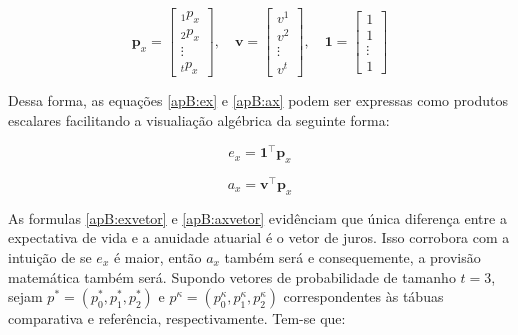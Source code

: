\begin{equation}
    \mathbf{p}_x = 
    \begin{bmatrix} 
    {}_{1}p_x \\  
    {}_{2}p_x \\ 
    \vdots \\ 
    {}_{t}p_x 
    \end{bmatrix}, \quad 
    \mathbf{v} = 
    \begin{bmatrix} 
    v^1 \\ 
    v^2 \\ 
    \vdots \\ 
    v^t 
    \end{bmatrix}, \quad 
    \mathbf{1} = 
    \begin{bmatrix} 
    1 \\ 
    1 \\ 
    \vdots \\ 
    1 
    \end{bmatrix}
\end{equation}

Dessa forma, as equações \ref{apB:ex} e \ref{apB:ax} podem ser expressas como produtos escalares facilitando a visualiação algébrica da seguinte forma:

\begin{equation}
    e_{x} = \mathbf{1}^\top \mathbf{p}_x
    \label{apB:exvetor}
\end{equation}

\begin{equation}
    a_{x} = \mathbf{v}^\top \mathbf{p}_x
    \label{apB:axvetor}
\end{equation}

As formulas \ref{apB:exvetor} e \ref{apB:axvetor} evidênciam que única diferença entre a expectativa de vida e a anuidade atuarial é o vetor de juros. Isso corrobora com a intuição de se $e_x$ é maior, então $a_x$ também será e consequemente, a provisão matemática também será.
\newpage
Supondo vetores de probabilidade de tamanho $t=3$, sejam $p^{*}=(p^{*}_{0}, p^{*}_{1}, p^{*}_{2})$ e $p^{\kappa}=(p^{\kappa}_{0}, p^{\kappa}_{1}, p^{\kappa}_{2})$ correspondentes às tábuas comparativa e referência, respectivamente. Tem-se que:

